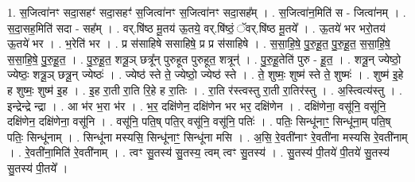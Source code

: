 \documentclass[17pt]{extarticle}
\begin{document}
1. स॒जित्वा॑नꣳ सदा॒सहꣳ॑ सदा॒सहꣳ॑ स॒जित्वा॑नꣳ स॒जित्वा॑नꣳ सदा॒सह᳚म् । . स॒जित्वा॑न॒मिति॑ स - जित्वा॑नम् । . स॒दा॒सह॒मिति॑ सदा - सह᳚म् । . वर्.षि॑ष्ठ मू॒तय॑ ऊ॒तये॒ वर्.षि॑ष्ठं॒ ॅवर्.षि॑ष्ठ मू॒तये᳚ । . ऊ॒तये॑ भर भरो॒तय॑ ऊ॒तये॑ भर । . भ॒रेति॑ भर । . प्र स॑साहिषे ससाहिषे॒ प्र प्र स॑साहिषे । . स॒सा॒हि॒षे॒ पु॒रु॒हू॒त॒ पु॒रु॒हू॒त॒ स॒सा॒हि॒षे॒ स॒सा॒हि॒षे॒ पु॒रु॒हू॒त॒ । . पु॒रु॒हू॒त॒ शत्रू॒ञ् छत्रू᳚न् पुरुहूत पुरुहूत॒ शत्रून्॑ । . पु॒रु॒हू॒तेति॑ पुरु - हू॒त॒ । . शत्रू॒न् ज्येष्ठो॒ ज्येष्ठः॒ शत्रू॒ञ् छत्रू॒न् ज्येष्ठः॑ । . ज्येष्ठ॑ स्ते ते॒ ज्येष्ठो॒ ज्येष्ठ॑ स्ते । . ते॒ शुष्मः॒ शुष्म॑ स्ते ते॒ शुष्मः॑ । . शुष्म॑ इ॒हे ह शुष्मः॒ शुष्म॑ इ॒ह । . इ॒ह रा॒ती रा॒ति रि॒हे ह रा॒तिः । . रा॒ति र॑स्त्वस्तु रा॒ती रा॒तिर॑स्तु । . अ॒स्त्वित्य॑स्तु । . इन्द्रेन्द्रे न्द्रा । . आ भ॑र भ॒रा भ॑र । . भ॒र॒ दक्षि॑णेन॒ दक्षि॑णेन भर भर॒ दक्षि॑णेन । . दक्षि॑णेना॒ वसू॑नि॒ वसू॑नि॒ दक्षि॑णेन॒ दक्षि॑णेना॒ वसू॑नि । . वसू॑नि॒ पति॒ष् पति॒र् वसू॑नि॒ वसू॑नि॒ पतिः॑ । . पतिः॒ सिन्धू॑नाꣳ॒॒ सिन्धू॑ना॒म् पति॒ष् पतिः॒ सिन्धू॑नाम् । . सिन्धू॑ना मस्यसि॒ सिन्धू॑नाꣳ॒॒ सिन्धू॑ना मसि । . अ॒सि॒ रे॒वती॑नाꣳ रे॒वती॑ना मस्यसि रे॒वती॑नाम् । . रे॒वती॑ना॒मिति॑ रे॒वती॑नाम् । . त्वꣳ सु॒तस्य॑ सु॒तस्य॒ त्वम् त्वꣳ सु॒तस्य॑ । . सु॒तस्य॑ पी॒तये॑ पी॒तये॑ सु॒तस्य॑ सु॒तस्य॑ पी॒तये᳚ । \newline
\end{document}
